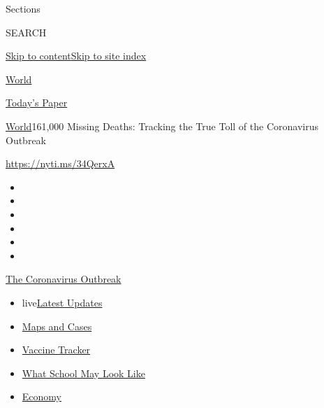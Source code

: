 Sections

SEARCH

\protect\hyperlink{site-content}{Skip to
content}\protect\hyperlink{site-index}{Skip to site index}

\href{https://www.nytimes.com/section/world}{World}

\href{https://myaccount.nytimes.com/auth/login?response_type=cookie\&client_id=vi}{}

\href{https://www.nytimes.com/section/todayspaper}{Today's Paper}

\href{/section/world}{World}\textbar{}161,000 Missing Deaths: Tracking
the True Toll of the Coronavirus Outbreak

\url{https://nyti.ms/34QerxA}

\begin{itemize}
\item
\item
\item
\item
\item
\item
\end{itemize}

\href{https://www.nytimes.com/news-event/coronavirus?action=click\&pgtype=Article\&state=default\&region=TOP_BANNER\&context=storylines_menu}{The
Coronavirus Outbreak}

\begin{itemize}
\tightlist
\item
  live\href{https://www.nytimes.com/2020/08/02/world/coronavirus-updates.html?action=click\&pgtype=Article\&state=default\&region=TOP_BANNER\&context=storylines_menu}{Latest
  Updates}
\item
  \href{https://www.nytimes.com/interactive/2020/us/coronavirus-us-cases.html?action=click\&pgtype=Article\&state=default\&region=TOP_BANNER\&context=storylines_menu}{Maps
  and Cases}
\item
  \href{https://www.nytimes.com/interactive/2020/science/coronavirus-vaccine-tracker.html?action=click\&pgtype=Article\&state=default\&region=TOP_BANNER\&context=storylines_menu}{Vaccine
  Tracker}
\item
  \href{https://www.nytimes.com/interactive/2020/07/29/us/schools-reopening-coronavirus.html?action=click\&pgtype=Article\&state=default\&region=TOP_BANNER\&context=storylines_menu}{What
  School May Look Like}
\item
  \href{https://www.nytimes.com/live/2020/07/31/business/stock-market-today-coronavirus?action=click\&pgtype=Article\&state=default\&region=TOP_BANNER\&context=storylines_menu}{Economy}
\end{itemize}

